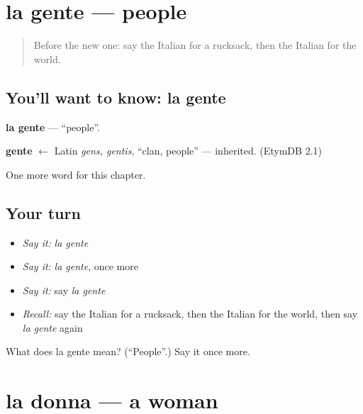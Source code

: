 \section[la gente]{la gente — people}

\label{lesson:IT-C102-gente}



\begin{quote}
Before the new one: say the Italian for a rucksack, then the Italian for the world.
\end{quote}

\subsection*{You'll want to know: la gente}
\textbf{la gente} — \textquotedblleft{}people\textquotedblright{}.

\begin{cousinweb}
\textbf{gente} $\leftarrow$ Latin \emph{gens, gentis}, \textquotedblleft{}clan, people\textquotedblright{} — inherited. (EtymDB 2.1)
\end{cousinweb}

\begin{grammarlens}[title={What you've built}]
One more word for this chapter.
\end{grammarlens}

\subsection*{Your turn}
\begin{itemize}
\raggedright
  \item \emph{Say it:} \emph{la gente}
  \item \emph{Say it:} \emph{la gente}, once more
  \item \emph{Say it:} say \emph{la gente}
  \item \emph{Recall:} say the Italian for a rucksack, then the Italian for the world, then say \emph{la gente} again
\end{itemize}

\begin{tcolorbox}[breakable,colback=teal!4,colframe=teal!35!black,title={Before you move on}]
What does la gente mean? (\textquotedblleft{}People\textquotedblright{}.) Say it once more.
\end{tcolorbox}
\section[la donna]{la donna — a woman}


